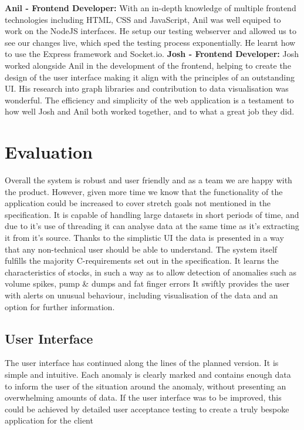 \documentclass[12pt]{article}
\begin{document}
  \newline\newline\textbf{Anil - Frontend Developer:}\newline
  With an in-depth knowledge of multiple frontend technologies including HTML, CSS and JavaScript, Anil was well equiped to work on the NodeJS interfaces.
  He setup our testing webserver and allowed us to see our changes live, which sped the testing process exponentially. He learnt how to use the Express framework
  and Socket.io.
  \newline\newline\textbf{Josh - Frontend Developer:}\newline
  Josh worked alongside Anil in the development of the frontend, helping to create the design of the user interface making it align with the principles of an outstanding UI.
  His research into graph libraries and contribution to data visualisation was wonderful.
  The efficiency and simplicity of the web application is a testament to how well Josh and Anil both worked together, and to what a great job they did.
\section{Evaluation}
Overall the system is robust and user friendly and as a team we are happy with the product. However, given more time we know that the functionality of the application could be increased to cover stretch goals not mentioned in the specification.
It is capable of handling large datasets in short periods of time, and due to it’s use of threading it can analyse data at the same time as it’s extracting it from it’s source.
Thanks to the simplistic UI the data is presented in a way that any non-technical user should be able to understand.
The system itself fulfills the majority C-requirements set out in the specification. It learns the characteristics of stocks, in such a way as to allow detection of anomalies such as volume spikes, pump \& dumps and fat finger errors
It swiftly provides the user with alerts on unusual behaviour, including visualisation of the data and an option for further information.
\subsection{User Interface}
The user interface has continued along the lines of the planned version. It is simple and intuitive.
Each anomaly is clearly marked and contains enough data to inform the user of the situation around the anomaly, without presenting an overwhelming amounts of data.
If the user interface was to be improved, this could be achieved by detailed user acceptance testing to create a truly bespoke application for the client
\end{document}
